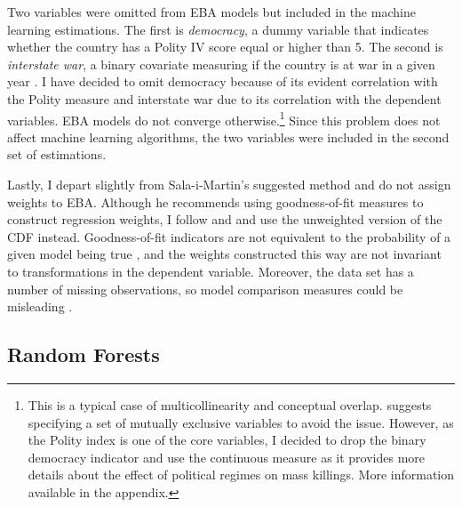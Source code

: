Two variables were omitted from EBA models but included in the machine learning estimations. The first is \textit{democracy}, a dummy variable that indicates whether the country has a Polity IV score equal or higher than 5. The second is \textit{interstate war}, a binary covariate measuring if the country is at war in a given year \citep{sarkees2010resort}. I have decided to omit democracy because of its evident correlation with the Polity measure and interstate war due to its correlation with the dependent variables. EBA models do not converge otherwise.\footnote{This is a typical case of multicollinearity and conceptual overlap. \citet{hlavac2016eba} suggests specifying a set of mutually exclusive variables to avoid the issue. However, as the Polity index is one of the core variables, I decided to drop the binary democracy indicator and use the continuous measure as it provides more details about the effect of political regimes on mass killings. More information available in the appendix.}  Since this problem does not affect machine learning algorithms, the two variables were included in the second set of estimations.
	
Lastly, I depart slightly from Sala-i-Martin's suggested method and do not assign weights to EBA. Although he recommends using goodness-of-fit measures to construct regression weights, I follow \citet{sturm2002robust} and \citet[299]{gassebner2016expect} and use the unweighted version of the CDF instead. Goodness-of-fit indicators are not equivalent to the probability of a given model being true \citep{anscombe1973graphs,king1986not}, and the weights constructed this way are not invariant to transformations in the dependent variable. Moreover, the data set has a number of missing observations, so model comparison measures could be misleading \citep{lall2016multiple}.
	
\subsection{Random Forests}
\label{sub:drf}

